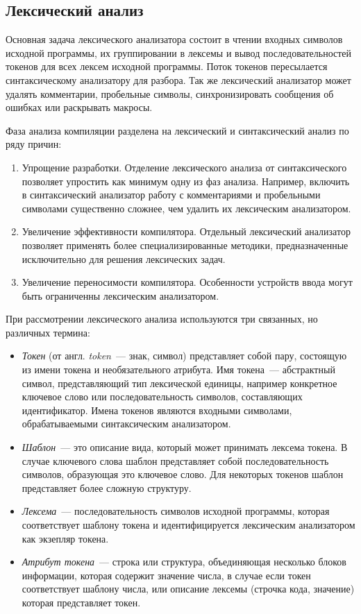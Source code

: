 \subsection{Лексический анализ} \label{sub112}

Основная задача лексического анализатора состоит в чтении входных символов исходной программы, их группировании в лексемы и вывод последовательностей токенов для всех лексем исходной программы. Поток токенов пересылается синтаксическому анализатору для разбора. Так же лексический анализатор может удалять комментарии, пробельные символы, синхронизировать сообщения об ошибках или раскрывать макросы.

Фаза анализа компиляции разделена на лексический и синтаксический анализ по ряду причин: 

\begin{enumerate} 
	\item{Упрощение разработки. Отделение лексического анализа от синтаксического позволяет упростить как минимум одну из фаз анализа. Например, включить в синтаксический анализатор работу с комментариями и пробельными символами существенно сложнее, чем удалить их лексическим анализатором.}
	\item{Увеличение эффективности компилятора. Отдельный лексический анализатор позволяет применять более специализированные методики, предназначенные исключительно для решения лексических задач.}
	\item{Увеличение переносимости компилятора. Особенности устройств ввода могут быть ограниченны лексическим анализатором.}
\end{enumerate}


При рассмотрении лексического анализа используются три связанных, но различных термина:


\begin{itemize} 
	\item{\textit{Токен} (от англ. \textit{token}~--- знак, символ) представляет собой пару, состоящую из имени токена и необязательного атрибута. Имя токена~--- абстрактный символ, представляющий тип лексической единицы, например конкретное ключевое слово или последовательность символов, составляющих идентификатор. Имена токенов являются входными символами, обрабатываемыми синтаксическим анализатором.}
	\item{\textit{Шаблон}~--- это описание вида, который может принимать лексема токена. В случае ключевого слова шаблон представляет собой последовательность символов, образующая это ключевое слово. Для некоторых токенов шаблон представляет более сложную структуру.}
	\item{\textit{Лексема}~--- последовательность символов исходной программы, которая соответствует шаблону токена и идентифицируется лексическим анализатором как экзепляр токена.}
	\item{\textit{Атрибут токена}~--- строка или структура, объединяющая несколько блоков информации, которая содержит значение числа, в случае если токен соответствует шаблону числа, или описание лексемы (строчка кода, значение) которая представляет токен. }
\end{itemize}



